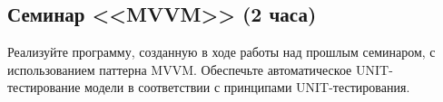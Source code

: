 \subsection{Семинар <<MVVM>> (2 часа)}

Реализуйте программу, созданную в ходе работы над прошлым семинаром, с использованием
паттерна MVVM. Обеспечьте автоматическое UNIT-тестирование модели в соответствии с принципами
UNIT-тестирования.

